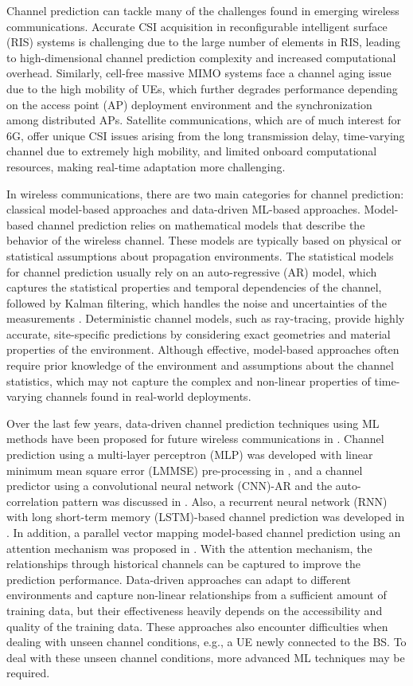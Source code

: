 \documentclass[lettersize,journal]{IEEEtran}
\begin{document}
Channel prediction can tackle many of the challenges found in emerging wireless communications. Accurate CSI acquisition in reconfigurable intelligent surface (RIS) systems is challenging due to the large number of elements in RIS, leading to high-dimensional channel prediction complexity and increased computational overhead. Similarly, cell-free massive MIMO systems face a channel aging issue due to the high mobility of UEs, which further degrades performance depending on the access point (AP) deployment environment and the synchronization among distributed APs. Satellite communications, which are of much interest for 6G, offer unique CSI issues arising from the long transmission delay, time-varying channel due to extremely high mobility, and limited onboard computational resources, making real-time adaptation more challenging.
	
In wireless communications, there are two main categories for channel prediction: classical model-based approaches and data-driven ML-based approaches. Model-based channel prediction relies on mathematical models that describe the behavior of the wireless channel. These models are typically based on physical or statistical assumptions about propagation environments. The statistical models for channel prediction usually rely on an auto-regressive (AR) model, which captures the statistical properties and temporal dependencies of the channel, followed by Kalman filtering, which handles the noise and uncertainties of the measurements \cite{Shikur15}. Deterministic channel models, such as ray-tracing, provide highly accurate, site-specific predictions by considering exact geometries and material properties of the environment. Although effective, model-based approaches often require prior knowledge of the environment and assumptions about the channel statistics, which may not capture the complex and non-linear properties of time-varying channels found in real-world deployments.

Over the last few years, data-driven channel prediction techniques using ML methods have been proposed for future wireless communications in \cite{Wu21}. Channel prediction using a multi-layer perceptron (MLP) was developed with linear minimum mean square error (LMMSE) pre-processing in \cite{Kim21}, and a channel predictor using a convolutional neural network (CNN)-AR and the auto-correlation pattern was discussed in \cite{Yuan20}. Also, a recurrent neural network (RNN) with long short-term memory (LSTM)-based channel prediction was developed in \cite{Jiang20}. In addition, a parallel vector mapping model-based channel prediction using an attention mechanism was proposed in \cite{Jiang22}. With the attention mechanism, the relationships through historical channels can be captured to improve the prediction performance. Data-driven approaches can adapt to different environments and capture non-linear relationships from a sufficient amount of training data, but their effectiveness heavily depends on the accessibility and quality of the training data. These approaches also encounter difficulties when dealing with unseen channel conditions, e.g., a UE newly connected to the BS. To deal with these unseen channel conditions, more advanced ML techniques may be required.
\end{document}
